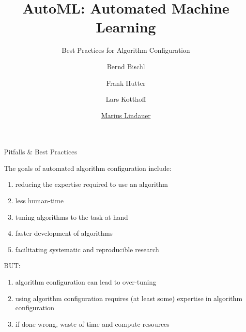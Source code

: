 




\title[AutoML: Overview]{AutoML: Automated Machine Learning}
\subtitle{Best Practices for Algorithm Configuration}
\author[Marius Lindauer]{Bernd Bischl \and Frank Hutter \and Lars Kotthoff \and \underline{Marius Lindauer}}
\institute{}
\date{}





	
	\maketitle
	

\begin{frame}[c]{Pitfalls \& Best Practices}

The \alert{goals} of automated algorithm configuration include:

\begin{enumerate}
	\pause
	\item reducing the expertise required to use an algorithm
	\pause
	\item less human-time
	\pause
	\item tuning algorithms to the task at hand
	\pause
	\item faster development of algorithms
	\pause
	\item facilitating systematic and reproducible research
\end{enumerate}

\bigskip
\alert{BUT}:

\begin{enumerate}
	\item algorithm configuration can lead to over-tuning
	\pause
	\item using algorithm configuration requires (at least some) expertise in algorithm configuration
	\pause
	\item if done wrong, waste of time and compute resources
\end{enumerate}

\end{frame}

